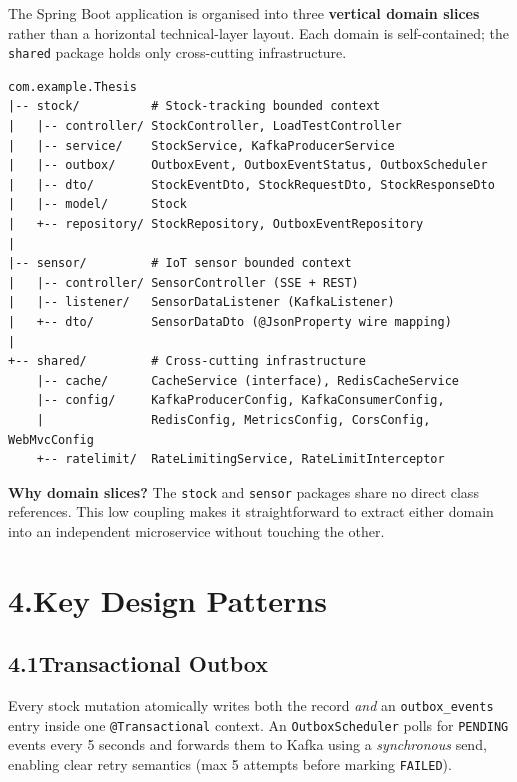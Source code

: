 \documentclass[11pt,a4paper]{article}
\newcommand{\pkg}[1]{\texttt{#1}}
\begin{document}
The Spring Boot application is organised into three \textbf{vertical domain
slices} rather than a horizontal technical-layer layout.
Each domain is self-contained; the \pkg{shared} package holds only
cross-cutting infrastructure.

\begin{lstlisting}[style=plain]
com.example.Thesis
|-- stock/          # Stock-tracking bounded context
|   |-- controller/ StockController, LoadTestController
|   |-- service/    StockService, KafkaProducerService
|   |-- outbox/     OutboxEvent, OutboxEventStatus, OutboxScheduler
|   |-- dto/        StockEventDto, StockRequestDto, StockResponseDto
|   |-- model/      Stock
|   +-- repository/ StockRepository, OutboxEventRepository
|
|-- sensor/         # IoT sensor bounded context
|   |-- controller/ SensorController (SSE + REST)
|   |-- listener/   SensorDataListener (KafkaListener)
|   +-- dto/        SensorDataDto (@JsonProperty wire mapping)
|
+-- shared/         # Cross-cutting infrastructure
    |-- cache/      CacheService (interface), RedisCacheService
    |-- config/     KafkaProducerConfig, KafkaConsumerConfig,
    |               RedisConfig, MetricsConfig, CorsConfig, WebMvcConfig
    +-- ratelimit/  RateLimitingService, RateLimitInterceptor
\end{lstlisting}

\noindent\textbf{Why domain slices?}
The \pkg{stock} and \pkg{sensor} packages share no direct class references.
This low coupling makes it straightforward to extract either domain
into an independent microservice without touching the other.

\section*{4.\quad Key Design Patterns}

\subsection*{4.1\quad Transactional Outbox}

Every stock mutation atomically writes both the record \emph{and} an
\texttt{outbox\_events} entry inside one \texttt{@Transactional} context.
An \texttt{OutboxScheduler} polls for \texttt{PENDING} events every 5 seconds
and forwards them to Kafka using a \emph{synchronous} send, enabling clear
retry semantics (max 5 attempts before marking \texttt{FAILED}).
\end{document}
